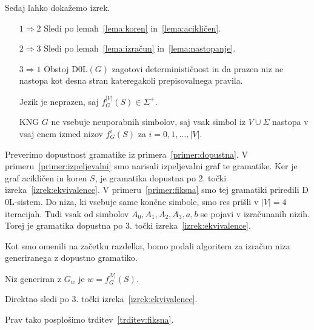 \documentclass[fin1, tisk]{fmfdelo}
\providecommand{\abs}[1]{\left\lvert #1 \right\rvert}
\theoremstyle{definition}
\begin{document}
Sedaj lahko dokažemo izrek. 

\begin{dokaz}
    \mbox{}
    \begin{itemize}
        \item[$1\Rightarrow 2$] Sledi po lemah~\ref{lema:koren} in~\ref{lema:acikličen}.
        \item[$2\Rightarrow 3$] Sledi po lemah~\ref{lema:izračun} in~\ref{lema:nastopanje}.
        \item[$3\Rightarrow 1$] Obstoj D$0$L$(G)$ zagotovi determinističnost in da
        prazen niz ne nastopa kot desna stran kateregakoli prepisovalnega pravila. 
        
        Jezik je neprazen, saj $f_G^{\abs{V}}(S) \in \Sigma^+$. 

        KNG $G$ ne vsebuje neuporabnih simbolov, saj vsak simbol iz $V \cup \Sigma$ nastopa v vsaj
        enem izmed nizov $f_G^i(S)$ za $i=0, 1, \ldots, \abs{V}$.
    \end{itemize}
\end{dokaz}

\begin{primer}\label{primer:PreverjanjeDopustnosti}
    Preverimo dopustnost gramatike iz primera~\ref{primer:dopustna}. 
    V primeru~\ref{primer:izpeljevalni} smo narisali izpeljevalni graf te gramatike. Ker je graf
    acikličen in koren $S$, je gramatika dopustna po $2.$ točki izreka~\ref{izrek:ekvivalence}.
    V primeru~\ref{primer:fiksna} smo tej gramatiki priredili D$0$L-sistem. Do niza, ki vsebuje 
    same končne simbole, smo res prišli v $\abs{V} = 4$ iteracijah. Tudi vsak od simbolov
    $A_0, A_1, A_2, A_3, a, b$ se pojavi v izračunanih nizih. Torej je gramatika dopustna po
    $3.$ točki izreka~\ref{izrek:ekvivalence}.
\end{primer}

Kot smo omenili na začetku razdelka, bomo podali algoritem za izračun niza generiranega z dopustno
gramatiko.

\begin{posledica}
    Niz generiran z $G_w$ je $w = f_G^{\abs{V}}(S).$
\end{posledica}

\begin{dokaz}
    Direktno sledi po $3.$ točki izreka~\ref{izrek:ekvivalence}.
\end{dokaz}

Prav tako posplošimo trditev~\ref{trditev:fiksna}.
\end{document}
